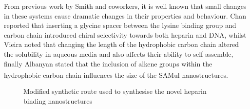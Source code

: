 From previous work by Smith and coworkers, it is well known that small changes in these systems cause dramatic changes in their properties and behaviour. Chan reported that inserting a glycine spacer between the lysine binding group and carbon chain introduced chiral selectivity towards both heparin and DNA, whilst Vieira noted that changing the length of the hydrophobic carbon chain altered the solubility in aqueous media and also affects their ability to self-assemble, finally Albanyan stated that the inclusion of alkene groups within the hydrophobic carbon chain influences the size of the SAMul nanostructures.\textsuperscript{\cite{Chan2016ChiralBinding,Vieira2017EmergenceHeparin,Albanyan2017Self-AssembledLigands}} 

\newpage
\begin{figure}[ht!]
\caption{Modified synthetic route used to synthesise the novel heparin binding nanostructures}
\label{C16-Ala-Lys_synthesis}
\end{figure}
\newpage

